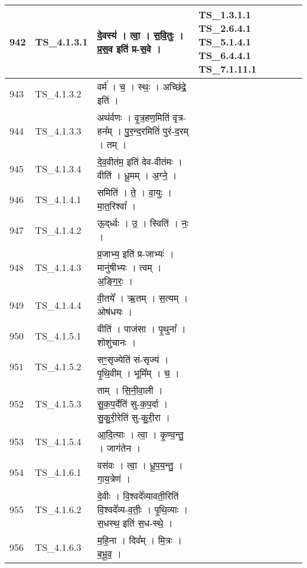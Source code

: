 \documentclass[17pt]{extarticle}
\begin{document}
\begin{longtable}{||p{0.4in}||p{0.9in}||p{4.0in}||p{0.9in}||}
        \hline
            942 & TS\_4.1.3.1 & दे॒वस्य॑   ।   त्वा॒   ।   स॒वि॒तुः   ।   प्र॒स॒व इति॑ प्र{-}स॒वे   ।    & TS\_1.3.1.1 TS\_2.6.4.1  TS\_5.1.4.1 TS\_6.4.4.1 TS\_7.1.11.1       \\
        \hline
            943 & TS\_4.1.3.2 & वर्म॑   ।   च॒   ।   स्थः॒   ।   अच्छि॑द्रे॒ इति॑   ।    &      \\
        \hline
            944 & TS\_4.1.3.3 & अथ॑र्वणः   ।   वृ॒त्र॒हण॒मिति॑ वृत्र{-}हन᳚म्   ।   पु॒र॒न्द॒रमिति॑ पुरं{-}द॒रम्   ।   तम्   ।    &      \\
        \hline
            945 & TS\_4.1.3.4 & दे॒व॒वीत॑म॒ इति॑ देव{-}वीत॑मः   ।   वीति॑   ।   धू॒मम्   ।   अ॒ग्ने॒   ।    &      \\
        \hline
            946 & TS\_4.1.4.1 & समिति॑   ।   ते॒   ।   वा॒युः   ।   मा॒त॒रिश्वा᳚   ।    &      \\
        \hline
            947 & TS\_4.1.4.2 & ऊ॒द्‌र्ध्वः   ।   उ॒   ।   स्विति॑   ।   नः॒   ।    &      \\
        \hline
            948 & TS\_4.1.4.3 & प्र॒जाभ्य॒ इति॑ प्र{-}जाभ्यः॑   ।   मानु॑षीभ्यः   ।   त्वम्   ।   अ॒ङ्गि॒रः॒   ।    &      \\
        \hline
            949 & TS\_4.1.4.4 & वी॒तये᳚   ।   ऋ॒तम्   ।   स॒त्यम्   ।   ओष॑धयः   ।    &      \\
        \hline
            950 & TS\_4.1.5.1 & वीति॑   ।   पाज॑सा   ।   पृ॒थुना᳚   ।   शोशु॑चानः   ।    &      \\
        \hline
            951 & TS\_4.1.5.2 & सꣳ॒॒सृज्येति॑ सं{-}सृज्य॑   ।   पृ॒थि॒वीम्   ।   भूमि᳚म्   ।   च॒   ।    &      \\
        \hline
            952 & TS\_4.1.5.3 & ताम्   ।   सि॒नी॒वा॒ली   ।   सु॒क॒प॒र्देति॑ सु{-}क॒प॒र्दा   ।   सु॒कु॒री॒रेति॑ सु{-}कु॒री॒रा   ।    &      \\
        \hline
            953 & TS\_4.1.5.4 & आ॒दि॒त्याः   ।   त्वा॒   ।   कृ॒ण्व॒न्तु॒   ।   जाग॑तेन   ।    &      \\
        \hline
            954 & TS\_4.1.6.1 & वस॑वः   ।   त्वा॒   ।   धू॒प॒य॒न्तु॒   ।   गा॒य॒त्रेण॑   ।    &      \\
        \hline
            955 & TS\_4.1.6.2 & दे॒वीः   ।   वि॒श्वदे᳚व्यावती॒रिति॑ वि॒श्वदे᳚व्य{-}व॒तीः॒   ।   पृ॒थि॒व्याः   ।   स॒धस्थ॒ इति॑ स॒ध{-}स्थे॒   ।    &      \\
        \hline
            956 & TS\_4.1.6.3 & म॒हि॒ना   ।   दिव᳚म्   ।   मि॒त्रः   ।   ब॒भू॒व॒   ।    &      \\
        \hline

\end{longtable}
\end{document}
